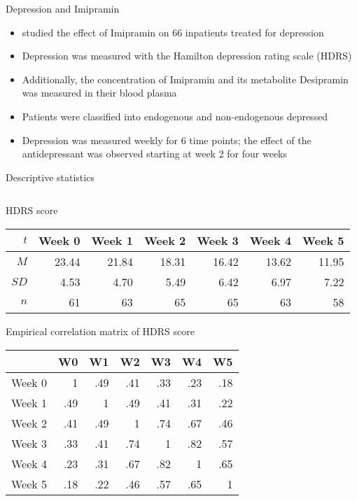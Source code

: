 \documentclass[aspectratio=169]{beamer}
\begin{document}
\begin{frame}{Depression and Imipramin \citep{ReisbyGram77}}
  \begin{itemize}
    \item \citet{ReisbyGram77} studied the effect of Imipramin on 66
      inpatients treated for depression
    \item Depression was measured with the Hamilton depression rating scale
      (HDRS)
    \item Additionally, the concentration of Imipramin and its metabolite
      Desipramin was measured in their blood plasma
    \item Patients were classified into endogenous and non-endogenous
      depressed
    \item Depression was measured weekly for 6 time points; the effect of
      the antidepressant was observed starting at week 2 for four weeks
  \end{itemize}
\end{frame}




\begin{frame}{Descriptive statistics}
\begin{columns}
\begin{column}{12cm}
HDRS score
\begin{center}
\begin{tabular}{rrrrrrr}
  \hline
  $t$ & Week 0 & Week 1 & Week 2 & Week 3 & Week 4 & Week 5 \\ 
  \hline
  $M$  & 23.44 & 21.84 & 18.31 & 16.42 & 13.62 & 11.95 \\ 
  $SD$ &  4.53 & 4.70  & 5.49  & 6.42  & 6.97  & 7.22 \\ 
  $n$  & 61    & 63    & 65    & 65    & 63    & 58    \\ 
  \hline
\end{tabular}
\end{center}
Empirical correlation matrix of HDRS score
\begin{center}
\begin{tabular}{rrrrrrr}
  \hline
   & W0 & W1 & W2 & W3 & W4 & W5 \\ 
  \hline
  Week 0 &   1 & .49 & .41 & .33 & .23 & .18 \\ 
  Week 1 & .49 &   1 & .49 & .41 & .31 & .22 \\ 
  Week 2 & .41 & .49 &   1 & .74 & .67 & .46 \\ 
  Week 3 & .33 & .41 & .74 &   1 & .82 & .57 \\ 
  Week 4 & .23 & .31 & .67 & .82 &   1 & .65 \\ 
  Week 5 & .18 & .22 & .46 & .57 & .65 &   1 \\ 
  \hline
\end{tabular}
\end{center}
\end{column}
\end{columns}
\end{frame}
\end{document}
